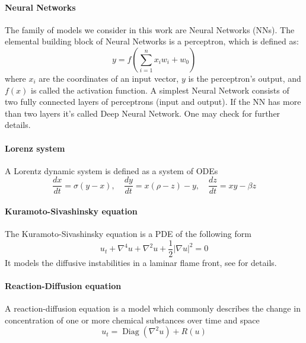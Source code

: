 \documentclass{article}
\DeclareMathOperator{\diag}{Diag}
\begin{document}
    \paragraph{Neural Networks}
    The family of models we consider in this work are Neural Networks (NNs). The elemental building block of Neural Networks is a perceptron, which is defined as:
    \begin{equation}
        \label{eqn:lorentz}
        y = f\left(\sum_{i = 1}^nx_iw_i + w_0\right)    
    \end{equation}
    where $x_i$ are the coordinates of an input vector, $y$ is the perceptron's output, and $f(x)$ is called the activation function. A simplest Neural Network consists of two fully connected layers of perceptrons (input and output). If the NN has more than two layers it's called Deep Neural Network. One may check \cite{deeplearningbook} for further details.
    \paragraph{Lorenz system} A Lorentz dynamic system is defined as a system of ODEs
    \begin{equation}
        \frac{dx}{dt} = \sigma(y-x), \quad \frac{dy}{dt} = x(\rho - z) - y, \quad \frac{dz}{dt} = xy-\beta z
    \end{equation}
    
    \paragraph{Kuramoto-Sivashinsky equation} The Kuramoto-Sivashinsky equation is a PDE of the following form
    \begin{equation}
        u_t + \nabla^4u + \nabla^2u + \frac{1}{2}|\nabla u|^2 = 0
    \end{equation}
    It models the diffusive instabilities in a laminar flame front, see \cite{KS} for details. 

    \paragraph{Reaction-Diffusion equation} A reaction-diffusion equation is a model which commonly describes the change in concentration of one or more chemical substances over time and space
    \begin{equation}
        u_t = \diag{(\nabla^2u)} + R(u)
    \end{equation}
\end{document}
